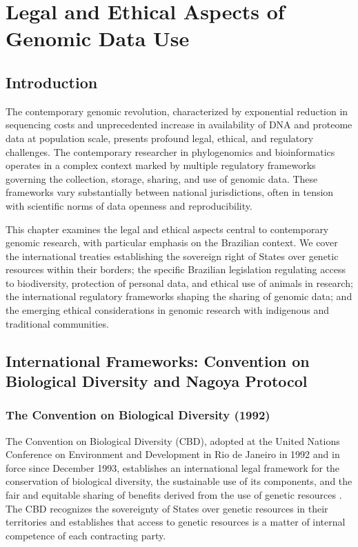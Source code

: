 \chapter{Legal and Ethical Aspects of Genomic Data Use}

\section{Introduction}

The contemporary genomic revolution, characterized by exponential reduction in sequencing costs and unprecedented increase in availability of DNA and proteome data at population scale, presents profound legal, ethical, and regulatory challenges. The contemporary researcher in phylogenomics and bioinformatics operates in a complex context marked by multiple regulatory frameworks governing the collection, storage, sharing, and use of genomic data. These frameworks vary substantially between national jurisdictions, often in tension with scientific norms of data openness and reproducibility.

This chapter examines the legal and ethical aspects central to contemporary genomic research, with particular emphasis on the Brazilian context. We cover the international treaties establishing the sovereign right of States over genetic resources within their borders; the specific Brazilian legislation regulating access to biodiversity, protection of personal data, and ethical use of animals in research; the international regulatory frameworks shaping the sharing of genomic data; and the emerging ethical considerations in genomic research with indigenous and traditional communities.

\section{International Frameworks: Convention on Biological Diversity and Nagoya Protocol}

\subsection{The Convention on Biological Diversity (1992)}

The Convention on Biological Diversity (CBD), adopted at the United Nations Conference on Environment and Development in Rio de Janeiro in 1992 and in force since December 1993, establishes an international legal framework for the conservation of biological diversity, the sustainable use of its components, and the fair and equitable sharing of benefits derived from the use of genetic resources \parencite{cbd1992}. The CBD recognizes the sovereignty of States over genetic resources in their territories and establishes that access to genetic resources is a matter of internal competence of each contracting party.

